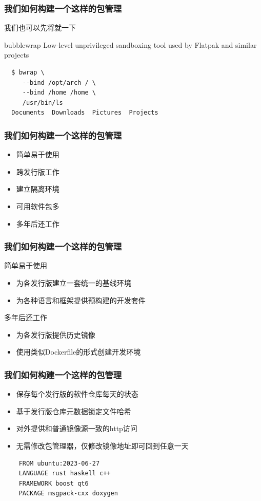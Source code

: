 \documentclass{ctexbeamer}
\begin{document}
\begin{frame}[fragile]
  \frametitle{我们如何构建一个这样的包管理}
  我们也可以先将就一下
  \begin{exampleblock}{bubblewrap}
    Low-level unprivileged sandboxing tool used by Flatpak and similar projects
  \end{exampleblock}
  \begin{small}
  \begin{verbatim}
  $ bwrap \
     --bind /opt/arch / \
     --bind /home /home \
     /usr/bin/ls
  Documents  Downloads  Pictures  Projects
  \end{verbatim}
  \end{small}
\end{frame}

\begin{frame}
  \frametitle{我们如何构建一个这样的包管理}
  \begin{itemize}
    \item 简单易于使用
    \item 跨发行版工作 \checkmark
    \item 建立隔离环境 \checkmark
    \item 可用软件包多 \checkmark
    \item 多年后还工作
  \end{itemize}
\end{frame}

\begin{frame}
  \frametitle{我们如何构建一个这样的包管理}
  \begin{block}{简单易于使用}
    \begin{itemize}
      \item 为各发行版建立一套统一的基线环境
      \item 为各种语言和框架提供预构建的开发套件
    \end{itemize}
  \end{block}
  \begin{block}{多年后还工作}
    \begin{itemize}
      \item 为各发行版提供历史镜像
      \item 使用类似Dockerfile的形式创建开发环境
    \end{itemize}
  \end{block}
\end{frame}

\begin{frame}[fragile]
  \frametitle{我们如何构建一个这样的包管理}
  \begin{itemize}
    \item 保存每个发行版的软件仓库每天的状态
    \item 基于发行版仓库元数据锁定文件哈希
    \item 对外提供和普通镜像源一致的http访问
    \item 无需修改包管理器，仅修改镜像地址即可回到任意一天
  \end{itemize}
  \begin{verbatim}
    FROM ubuntu:2023-06-27
    LANGUAGE rust haskell c++
    FRAMEWORK boost qt6
    PACKAGE msgpack-cxx doxygen
  \end{verbatim}
\end{frame}
\end{document}
